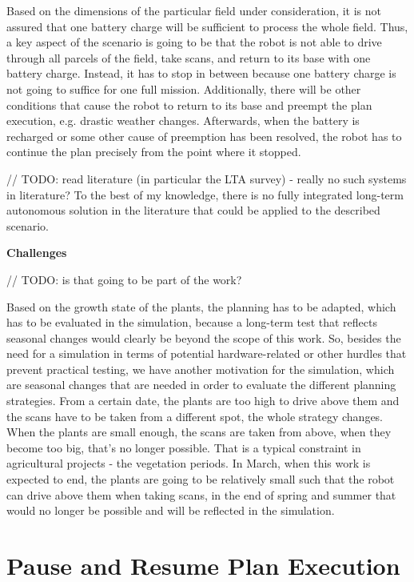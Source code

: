 \documentclass[german, master, expose, latin1]{base/thesis_KBS}
\begin{document}
Based on the dimensions of the particular field under consideration, it is not assured that one battery charge will be sufficient to process the whole field.
Thus, a key aspect of the scenario is going to be that the robot is not able to drive through all parcels of the field, take scans, and return to its base with one battery charge.
Instead, it has to stop in between because one battery charge is not going to suffice for one full mission. Additionally, there will be other conditions that cause
the robot to return to its base and preempt the plan execution, e.g. drastic weather changes. Afterwards, when the battery is recharged or some other cause of preemption
has been resolved, the robot has to continue the plan precisely from the point where it stopped.\newline

// TODO: read literature (in particular the LTA survey) - really no such systems in literature?
To the best of my knowledge, there is no fully integrated long-term autonomous solution in the literature that could be applied to the described scenario.\newline

\textbf{Challenges}\newline

// TODO: is that going to be part of the work?\newline

Based on the growth state of the plants, the planning has to be adapted, which has to be evaluated in the simulation, because a long-term test that reflects
seasonal changes would clearly be beyond the scope of this work. So, besides the need for a simulation in terms of potential hardware-related or other hurdles
that prevent practical testing, we have another motivation for the simulation, which are seasonal changes that are needed in order to evaluate the different
planning strategies. From a certain date, the plants are too high to drive above them and the scans have to be taken from a different spot, the whole strategy changes.
When the plants are small enough, the scans are taken from above, when they become too big, that's no longer possible.
That is a typical constraint in agricultural projects - the vegetation periods.
In March, when this work is expected to end, the plants are going to be relatively small such that the robot can drive above them when taking
scans, in the end of spring and summer that would no longer be possible and will be reflected in the simulation.

\section{Pause and Resume Plan Execution}
\end{document}
